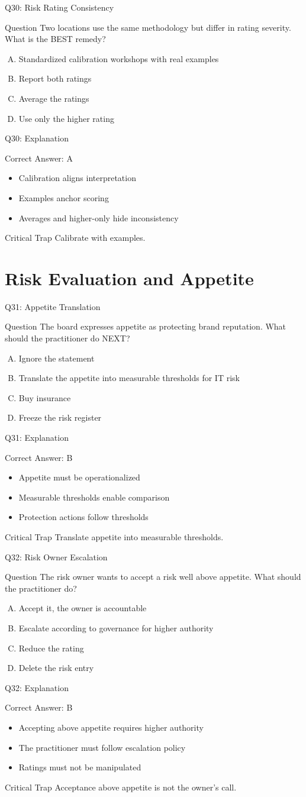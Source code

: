 \documentclass[aspectratio=169]{beamer}
\newcommand{\hq}[7]{%
	\begin{frame}{Q#1: #2}
		\begin{block}{Question}
			#3
		\end{block}
		\begin{enumerate}[(A)]
			#4
		\end{enumerate}
	\end{frame}
	\begin{frame}{Q#1: Explanation}
		\begin{block}{Correct Answer: #5}
			\begin{itemize}
				#6
			\end{itemize}
		\end{block}
		\begin{alertblock}{Critical Trap}
			#7
		\end{alertblock}
	\end{frame}
}
\begin{document}
	\hq{30}{Risk Rating Consistency}
	{Two locations use the same methodology but differ in rating severity. What is the BEST remedy?}
	{\item Standardized calibration workshops with real examples
		\item Report both ratings
		\item Average the ratings
		\item Use only the higher rating}
	{A}
	{\item Calibration aligns interpretation
		\item Examples anchor scoring
		\item Averages and higher-only hide inconsistency}
	{Calibrate with examples.}
	
	\section{Risk Evaluation and Appetite}
	
	\hq{31}{Appetite Translation}
	{The board expresses appetite as protecting brand reputation. What should the practitioner do NEXT?}
	{\item Ignore the statement
		\item Translate the appetite into measurable thresholds for IT risk
		\item Buy insurance
		\item Freeze the risk register}
	{B}
	{\item Appetite must be operationalized
		\item Measurable thresholds enable comparison
		\item Protection actions follow thresholds}
	{Translate appetite into measurable thresholds.}
	
	\hq{32}{Risk Owner Escalation}
	{The risk owner wants to accept a risk well above appetite. What should the practitioner do?}
	{\item Accept it, the owner is accountable
		\item Escalate according to governance for higher authority
		\item Reduce the rating
		\item Delete the risk entry}
	{B}
	{\item Accepting above appetite requires higher authority
		\item The practitioner must follow escalation policy
		\item Ratings must not be manipulated}
	{Acceptance above appetite is not the owner’s call.}
	
\end{document}
